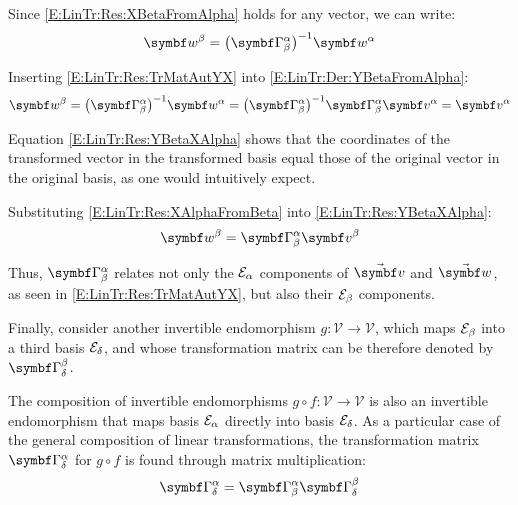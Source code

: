 Since \eqref{E:LinTr:Res:XBetaFromAlpha} holds for any vector, we can write:
\begin{equation} \label{E:LinTr:Der:YBetaFromAlpha}
\vprj{w}{\beta} = \invp{\AutM{\alpha}{\beta}} \vprj{w}{\alpha}
\end{equation}

Inserting \eqref{E:LinTr:Res:TrMatAutYX} into \eqref{E:LinTr:Der:YBetaFromAlpha}:
\begin{equation} \label{E:LinTr:Res:YBetaXAlpha}
\vprj{w}{\beta} = \invp{\AutM{\alpha}{\beta}} \vprj{w}{\alpha} = \invp{\AutM{\alpha}{\beta}} \AutM{\alpha}{\beta} \vprj{v}{\alpha} = \vprj{v}{\alpha}
\end{equation}

Equation \eqref{E:LinTr:Res:YBetaXAlpha} shows that the coordinates of the transformed vector in the transformed basis equal those of the original vector in the original basis, as one would intuitively expect.

Substituting \eqref{E:LinTr:Res:XAlphaFromBeta} into \eqref{E:LinTr:Res:YBetaXAlpha}:
\begin{equation} \label{E:LinTr:Res:TrMatAutYXBeta}
\vprj{w}{\beta} = \AutM{\alpha}{\beta} \vprj{v}{\beta}
\end{equation}

Thus, $\AutM{\alpha}{\beta}$ relates not only the $\basis[\alpha]$ components of $\vabs{v}$ and $\vabs{w}$, as seen in \eqref{E:LinTr:Res:TrMatAutYX}, but also their $\basis[\beta]$ components.

Finally, consider another invertible endomorphism $g:\mathcal{V}\rightarrow\mathcal{V}$, which maps $\basis[\beta]$ into a third basis $\basis[\delta]$, and whose transformation matrix can be therefore denoted by $\AutM{\beta}{\delta}$.

The composition of invertible endomorphisms $g \circ f: \mathcal{V} \rightarrow \mathcal{V}$ is also an invertible endomorphism that maps basis $\basis[\alpha]$ directly into basis $\basis[\delta]$. As a particular case of the general composition of linear transformations, the transformation matrix $\AutM{\alpha}{\delta}$ for $g \circ f$ is found through matrix multiplication:
\begin{equation*}
\AutM{\alpha}{\delta} = \AutM{\alpha}{\beta} \AutM{\beta}{\delta}
\end{equation*}

\begin{comment}
\quat{q}=0
\qvec{q}=\mcol{0}
\qcmp{q}{0}
\qreal{q}
\begin{equation}
\quat{q}=\qcol{\qreal{q}}{\qvec{q}}
\end{equation}
\qi
\qj
\qk
\end{comment}

\endinput